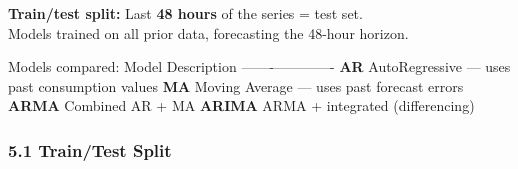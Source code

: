 \documentclass[11pt]{article}
\begin{document}
\textbf{Train/test split:} Last \textbf{48 hours} of the series = test
set.\\
Models trained on all prior data, forecasting the 48-hour horizon.

Models compared: \textbar{} Model \textbar{} Description \textbar{}
\textbar-------\textbar-------------\textbar{} \textbar{} \textbf{AR}
\textbar{} AutoRegressive --- uses past consumption values \textbar{}
\textbar{} \textbf{MA} \textbar{} Moving Average --- uses past forecast
errors \textbar{} \textbar{} \textbf{ARMA} \textbar{} Combined AR + MA
\textbar{} \textbar{} \textbf{ARIMA} \textbar{} ARMA + integrated
(differencing) \textbar{}

    \subsubsection{5.1 Train/Test Split}\label{traintest-split}
\end{document}
